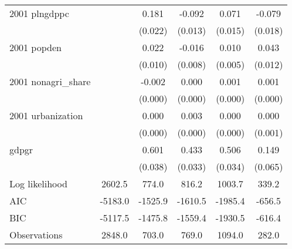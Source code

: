 \begin{table}[htbp]
\begin{tabular}{l*{5}{c}}
2001 plngdppc       &                     &       0.181\sym{***}&      -0.092\sym{***}&       0.071\sym{***}&      -0.079\sym{***}\\
                    &                     &     (0.022)         &     (0.013)         &     (0.015)         &     (0.018)         \\
2001 popden         &                     &       0.022\sym{**} &      -0.016\sym{**} &       0.010\sym{*}  &       0.043\sym{***}\\
                    &                     &     (0.010)         &     (0.008)         &     (0.005)         &     (0.012)         \\
2001 nonagri\_share  &                     &      -0.002\sym{***}&       0.000         &       0.001\sym{*}  &       0.001\sym{**} \\
                    &                     &     (0.000)         &     (0.000)         &     (0.000)         &     (0.000)         \\
2001 urbanization   &                     &       0.000         &       0.003\sym{***}&       0.000         &       0.000         \\
                    &                     &     (0.000)         &     (0.000)         &     (0.000)         &     (0.001)         \\
gdpgr               &                     &       0.601\sym{***}&       0.433\sym{***}&       0.506\sym{***}&       0.149\sym{**} \\
                    &                     &     (0.038)         &     (0.033)         &     (0.034)         &     (0.065)         \\
\hline
Log likelihood      &      2602.5         &       774.0         &       816.2         &      1003.7         &       339.2         \\
AIC                 &     -5183.0         &     -1525.9         &     -1610.5         &     -1985.4         &      -656.5         \\
BIC                 &     -5117.5         &     -1475.8         &     -1559.4         &     -1930.5         &      -616.4         \\
Observations        &      2848.0         &       703.0         &       769.0         &      1094.0         &       282.0         \\
\hline\hline
\end{tabular}
\end{table}
